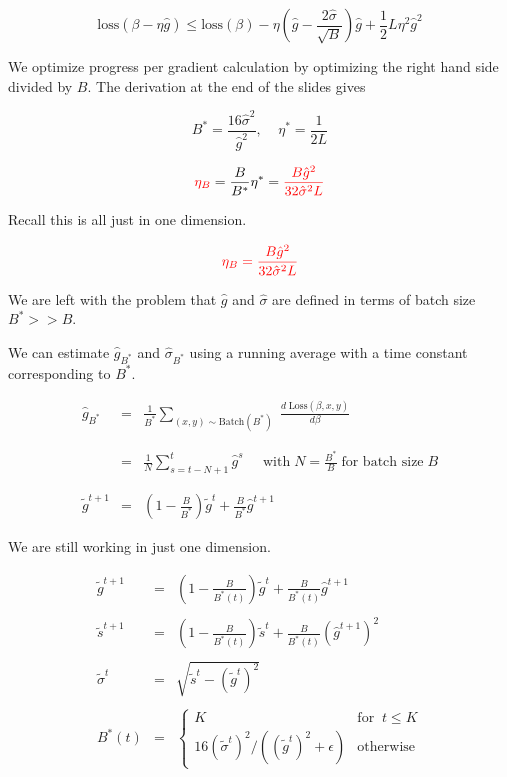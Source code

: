 {

$$\mathrm{loss}(\beta - \eta\hat{g}) \leq \mathrm{loss}(\beta) - \eta \left(\hat{g} - \frac{2\hat{\sigma}}{\sqrt{B}} \right)\hat{g}  + \frac{1}{2}L \eta^2 \hat{g}^2$$

\vfill
We optimize progress per gradient calculation by optimizing the right hand side divided by $B$.  The derivation at the end of the slides gives

\vfill
$$B^*  =  \frac{16\hat{\sigma}^2}{\hat{g}^2},\;\;\;\;\eta^*  =  \frac{1}{2L}$$

\vfill
$${\color{red} \eta_B} = \frac{B}{B^*} \eta^* = {\color{red} \frac{B \hat{g}^2}{32\hat{\sigma}^2L}}$$

\vfill
Recall this is all just in one dimension.


$${\color{red} \eta_B = \frac{B \hat{g}^2}{32\hat{\sigma}^2L}}$$

\vfill
We are left with the problem that $\hat{g}$ and $\hat{\sigma}$ are defined in terms of batch size $B^* >> B$.

\vfill
We can estimate $\hat{g}_{B^*}$ and $\hat{\sigma}_{B^*}$ using a running average with a time constant corresponding to $B^*$.


\begin{eqnarray*}
  \hat{g}_{B^*} & = & \frac{1}{B^*} \sum_{(x,y) \sim \mathrm{Batch}(B^*)}\; \frac{d\;\mathrm{Loss}(\beta,x,y)}{d\beta} \\
  \\
  \\
  & = & \frac{1}{N} \sum_{s=t-N+1}^t \hat{g}^s\;\;\;\;\;\mbox{with}\;N= \frac{B^*}{B} \;\mbox{for batch size}\;B \\
  \\
  \\
  \tilde{g}^{t+1} & = & \left(1-\frac{B}{B^*}\right)\tilde{g}^t + \frac{B}{B^*} \hat{g}^{t+1}
\end{eqnarray*}

\vfill
We are still working in just one dimension.

\begin{eqnarray*}
  \tilde{g}^{t+1} & = & \left(1-\frac{B}{B^*(t)}\right)\tilde{g}^t + \frac{B}{B^*(t)} \hat{g}^{t+1} \\
  \\
  \tilde{s}^{t+1} & = & \left(1-\frac{B}{B^*(t)}\right)\tilde{s}^t + \frac{B}{B^*(t)} (\hat{g}^{t+1})^2 \\
  \\
  \tilde{\sigma}^t & = & \sqrt{\tilde{s}^t - (\tilde{g}^t)^2} \\
  \\
  B^*(t) &= & \left\{\begin{array}{ll} K & \mbox{for}\;\; t \leq K \\
  16(\tilde{\sigma}^t)^2/((\tilde{g}^t)^2 + \epsilon) & \mbox{otherwise} \end{array}\right.
\end{eqnarray*}

}
